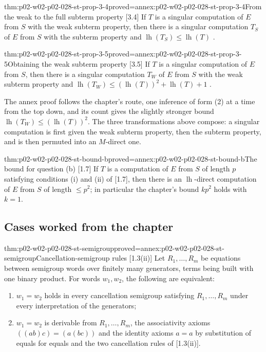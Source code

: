 \begin{hbtheorem}{thm:p02-w02-p02-028-st-prop-3-4}{proved=annex:p02-w02-p02-028-st-prop-3-4}{From the weak to the full subterm property [3.4]}
If \(T\) is a singular computation of \(E\) from \(S\) with the weak subterm
property, then there is a singular computation \(T_S\) of \(E\) from \(S\)
with the subterm property and \(\operatorname{lh}(T_S)\leq\operatorname{lh}(T)\)
\cite[\S3.4, pp.~907--908]{Statman1977}.
\end{hbtheorem}

\begin{hbtheorem}{thm:p02-w02-p02-028-st-prop-3-5}{proved=annex:p02-w02-p02-028-st-prop-3-5}{Obtaining the weak subterm property [3.5]}
If \(T\) is a singular computation of \(E\) from \(S\), then there is a
singular computation \(T_W\) of \(E\) from \(S\) with the weak subterm
property and
\(\operatorname{lh}(T_W)\leq(\operatorname{lh}(T))^2+\operatorname{lh}(T)+1\)
\cite[\S3.5, pp.~908--910]{Statman1977}.
\end{hbtheorem}

The annex proof follows the chapter's route, one inference of form (2) at a
time from the top down, and its count gives the slightly stronger bound
\(\operatorname{lh}(T_W)\leq(\operatorname{lh}(T))^2\).  The three
transformations above compose: a singular computation is first given the
weak subterm property, then the subterm property, and is then permuted into
an \(M\)-direct one.

\begin{hbcorollary}{thm:p02-w02-p02-028-st-bound-b}{proved=annex:p02-w02-p02-028-st-bound-b}{The bound for question (b) [1.7]}
If \(T\) is a computation of \(E\) from \(S\) of length \(p\) satisfying
conditions (i) and (ii) of [1.7], then there is an
\(\operatorname{lh}\)-direct computation of \(E\) from \(S\) of length
\(\leq p^2\); in particular the chapter's bound \(kp^2\) holds with
\(k=1\).
\end{hbcorollary}

\subsection{Cases worked from the chapter}
\label{sec:p02-w02-p02-028-st-cases}

\begin{hbtheorem}{thm:p02-w02-p02-028-st-semigroup}{proved=annex:p02-w02-p02-028-st-semigroup}{Cancellation-semigroup rules [1.3(ii)]}
Let \(R_1,\ldots,R_m\) be equations between semigroup words over finitely
many generators, terms being built with one binary product.  For words
\(w_1,w_2\), the following are equivalent:
\begin{enumerate}
  \item \(w_1=w_2\) holds in every cancellation semigroup satisfying
        \(R_1,\ldots,R_m\) under every interpretation of the generators;
  \item \(w_1=w_2\) is derivable from \(R_1,\ldots,R_m\), the associativity
        axioms \(((ab)c)=(a(bc))\) and the identity axioms \(a=a\) by
        substitution of equals for equals and the two cancellation rules of
        [1.3(ii)].
\end{enumerate}
\end{hbtheorem}

